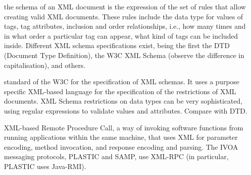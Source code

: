 {
    	the schema of an \gls{XML} document is the expression of the
        set of rules that allow creating valid XML documents. These
        rules include the data type for values of \gls{tags}, tag
        \gls{attributes}, inclusion and order relationships, i.e., how
        many times and in what order a particular tag can appear, what
        kind of tags can be included inside. Different XML schema
        specifications exist, being the first the \gls{DTD} (Document
        Type Definition), the \gls{W3C} \gls{XML Schema} (observe the
        difference in capitalisation), and others.
}

{
    	standard of the \gls{W3C} for the specification of \gls{XML
        schema}s. It uses a purpose specific \gls{XML}-based language
        for the specification of the restrictions of XML documents. XML
        Schema restrictions on data types can be very sophisticated,
        using \gls{regular expressions} to validate values and
        attributes. Compare with \gls{DTD}.
}

{    	\gls{XML}-based Remote Procedure Call, a way of invoking
        software functions from running applications within the same
        machine, that uses XML for parameter encoding, method
        invocation, and response encoding and parsing. The \gls{IVOA}
        messaging protocols, \gls{PLASTIC} and \gls{SAMP}, use XML-RPC
        (in particular, PLASTIC uses \gls{Java-RMI}).
}
